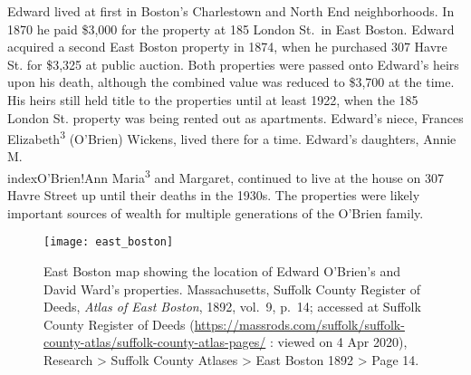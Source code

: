 Edward lived at first in Boston's Charlestown\cite{MaryAnn3OBrienBirth} and North End\cite{Edward3OBrienBirth} neighborhoods. In 1870 he paid \$3,000 for the property at 185 London St.\ in East Boston.\cite{LondonStDeed,LondonStMap} Edward acquired a second East Boston property in 1874, when he purchased 307 Havre St. for \$3,325 at public auction.\cite{HavrePurchase,HavreMap} Both properties were passed onto Edward's heirs upon his death, although the combined value was reduced to \$3,700 at the time.\cite{Edward2OBrienProbate} His heirs still held title to the properties until at least 1922,\cite{Bromley1922} when the 185 London St. property was being rented out as apartments.\cite{GlobeRobbery} Edward's niece, Frances Elizabeth\textsuperscript{3} (O'Brien) Wickens, lived there for a time.\cite{Frances3OBrien1914} Edward's daughters, Annie M.\\index{O'Brien!Ann Maria\textsuperscript{3}} and Margaret, continued to live at the house on 307 Havre Street up until their deaths in the 1930s.\cite{AnnMaria3OBrienDeath,Margaret3OBrienDeath} The properties were likely important sources of wealth for multiple generations of the O'Brien family.

\begin{figure}
	\centering
	\texttt{[image: east\_boston]}
	\caption{East Boston map showing the location of Edward O'Brien's and David Ward's properties. Massachusetts, Suffolk County Register of Deeds, \textit{Atlas of East Boston}, 1892, vol.\ 9, p.\ 14; accessed at Suffolk County Register of Deeds (\url{https://massrods.com/suffolk/suffolk-county-atlas/suffolk-county-atlas-pages/} : viewed on 4 Apr 2020), Research > Suffolk County Atlases > East Boston 1892 > Page 14.}
\end{figure}

